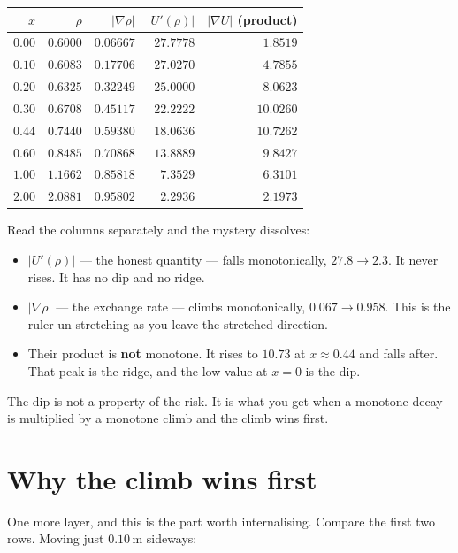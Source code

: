 \documentclass[11pt]{article}
\begin{document}
\begin{center}
\begin{tabular}{rrrrr}
\toprule
$x$ & $\rho$ & $|\nabla\rho|$ & $|U'(\rho)|$ & $|\nabla U|$ (product)\\
\midrule
$0.00$ & $0.6000$ & $0.06667$ & $27.7778$ & $1.8519$\\
$0.10$ & $0.6083$ & $0.17706$ & $27.0270$ & $4.7855$\\
$0.20$ & $0.6325$ & $0.32249$ & $25.0000$ & $8.0623$\\
$0.30$ & $0.6708$ & $0.45117$ & $22.2222$ & $10.0260$\\
$0.44$ & $0.7440$ & $0.59380$ & $18.0636$ & $\mathbf{10.7262}$\\
$0.60$ & $0.8485$ & $0.70868$ & $13.8889$ & $9.8427$\\
$1.00$ & $1.1662$ & $0.85818$ & $7.3529$  & $6.3101$\\
$2.00$ & $2.0881$ & $0.95802$ & $2.2936$  & $2.1973$\\
\bottomrule
\end{tabular}
\end{center}

Read the columns separately and the mystery dissolves:

\begin{itemize}
  \item $|U'(\rho)|$ --- the honest quantity --- falls monotonically,
        $27.8\to2.3$. It never rises. It has no dip and no ridge.
  \item $|\nabla\rho|$ --- the exchange rate --- climbs monotonically,
        $0.067\to0.958$. This is the ruler un-stretching as you leave the
        stretched direction.
  \item Their product is \textbf{not} monotone. It rises to $10.73$ at
        $x\approx0.44$ and falls after. That peak is the ridge, and the low
        value at $x=0$ is the dip.
\end{itemize}

The dip is not a property of the risk. It is what you get when a monotone
decay is multiplied by a monotone climb and the climb wins first.

\section{Why the climb wins first}

One more layer, and this is the part worth internalising. Compare the first
two rows. Moving just $0.10$\,m sideways:
\end{document}
